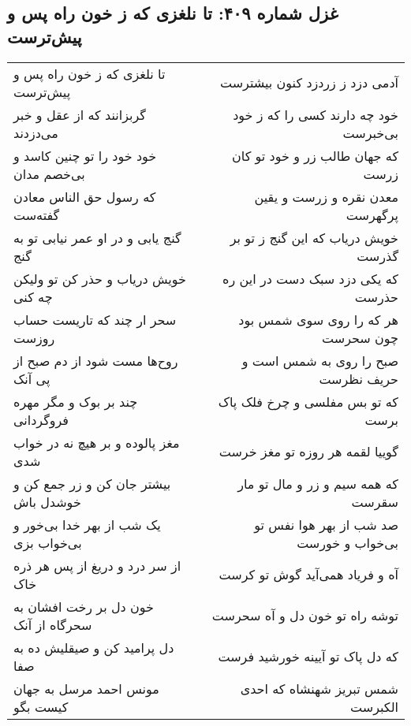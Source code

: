 \begin{center}
\section*{غزل شماره ۴۰۹: تا نلغزی که ز خون راه پس و پیش‌ترست}
\label{sec:0409}
\begin{longtable}{l p{0.5cm} r}
تا نلغزی که ز خون راه پس و پیش‌ترست
&&
آدمی دزد ز زردزد کنون بیشترست
\\
گربزانند که از عقل و خبر می‌دزدند
&&
خود چه دارند کسی را که ز خود بی‌خبرست
\\
خود خود را تو چنین کاسد و بی‌خصم مدان
&&
که جهان طالب زر و خود تو کان زرست
\\
که رسول حق الناس معادن گفته‌ست
&&
معدن نقره و زرست و یقین پرگهرست
\\
گنج یابی و در او عمر نیابی تو به گنج
&&
خویش دریاب که این گنج ز تو بر گذرست
\\
خویش دریاب و حذر کن تو ولیکن چه کنی
&&
که یکی دزد سبک دست در این ره حذرست
\\
سحر ار چند که تاریست حساب روزست
&&
هر که را روی سوی شمس بود چون سحرست
\\
روح‌ها مست شود از دم صبح از پی آنک
&&
صبح را روی به شمس است و حریف نظرست
\\
چند بر بوک و مگر مهره فروگردانی
&&
که تو بس مفلسی و چرخ فلک پاک برست
\\
مغز پالوده و بر هیچ نه در خواب شدی
&&
گوییا لقمه هر روزه تو مغز خرست
\\
بیشتر جان کن و زر جمع کن و خوشدل باش
&&
که همه سیم و زر و مال تو مار سقرست
\\
یک شب از بهر خدا بی‌خور و بی‌خواب بزی
&&
صد شب از بهر هوا نفس تو بی‌خواب و خورست
\\
از سر درد و دریغ از پس هر ذره خاک
&&
آه و فریاد همی‌آید گوش تو کرست
\\
خون دل بر رخت افشان به سحرگاه از آنک
&&
توشه راه تو خون دل و آه سحرست
\\
دل پرامید کن و صیقلیش ده به صفا
&&
که دل پاک تو آیینه خورشید فرست
\\
مونس احمد مرسل به جهان کیست بگو
&&
شمس تبریز شهنشاه که احدی الکبرست
\\
\end{longtable}
\end{center}
